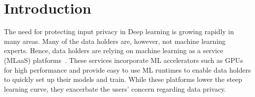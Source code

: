 \section{Introduction}
The need for protecting input privacy in Deep learning is growing rapidly in many areas. 
Many of the data holders are, however, not machine learning experts. Hence, data holders are relying on machine learning as a service (MLaaS) platforms~\citep{AzureML,Google,Amazon}. 
These services incorporate ML accelerators such as GPUs for high performance and provide easy to use ML runtimes to enable data holders to quickly set up their models and train. While these platforms lower the steep learning curve, they exacerbate the users' concern regarding data privacy. %




